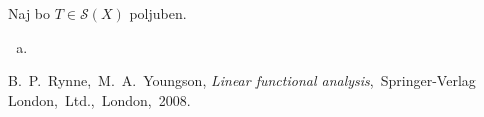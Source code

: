 \documentclass[mat2]{matdelo}
\begin{document}
		\begin{dokaz}
			Naj bo $T\in \mathcal{S}(X)$ poljuben.
			\begin{enumerate}[a)]
				\item 
			\end{enumerate}
		\end{dokaz}
		
	\begin{thebibliography}{99}
		 B.~P.~Rynne,~M.~A.~Youngson, \emph{Linear functional analysis},~Springer-Verlag London,~Ltd.,~London,~2008.
	\end{thebibliography}
	
\end{document}
